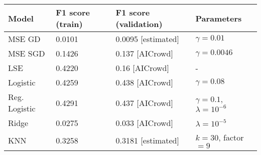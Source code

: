 \documentclass[10pt,conference,compsocconf]{IEEEtran}
\begin{document}
\noindent\begin{minipage}{\textwidth}
\centering
\begin{tabular}[c]{|l||l|l|l|}
  \hline
  Model & F1 score (train) & F1 score (validation) & Parameters \\
  \hline
  MSE GD & 0.0101 & 0.0095 [estimated] & $\gamma=0.01$ \\ 
  MSE SGD & 0.1426 & 0.137 [AICrowd] & $\gamma=0.0046$ \\
  LSE & 0.4220 & 0.16 [AICrowd] & - \\
  Logistic & 0.4259 & 0.438 [AICrowd] & $\gamma=0.08$ \\
  Reg. Logistic & 0.4291 &  0.437 [AICrowd] & $\gamma=0.1$, $\lambda=10^{-6}$ \\
  Ridge & 0.0275 & 0.033 [AICrowd] & $\lambda=10^{-5}$ \\
  KNN & 0.3258 & 0.3181 [estimated] & $k=30$, factor$=9$ \\
  \hline
\end{tabular}
\label{tab:models_comparison}
\end{minipage}

\vspace{0.3 cm}
\end{document}
